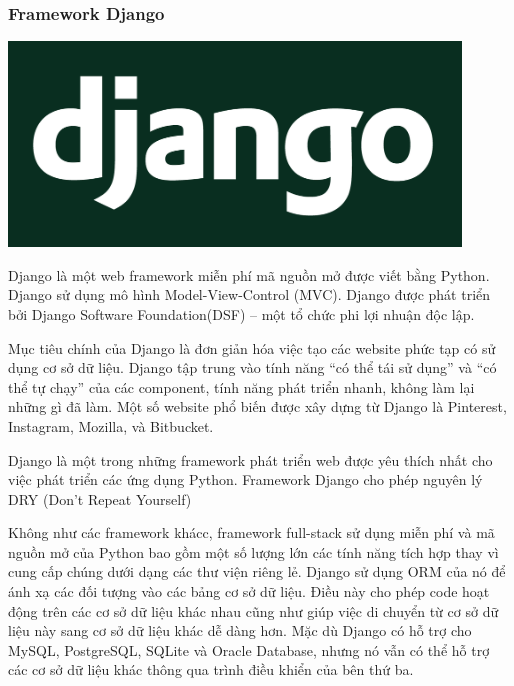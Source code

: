 \subsubsection{Framework Django}
\begin{center}
  \captionsetup{type=figure}
  \includegraphics[width=12cm]{img/django.png}
\end{center}

Django là một web framework miễn phí mã nguồn mở được viết bằng Python. Django sử dụng mô hình Model-View-Control (MVC). Django được phát triển bởi Django Software Foundation(DSF) – một tổ chức phi lợi nhuận độc lập.

Mục tiêu chính của Django là đơn giản hóa việc tạo các website phức tạp có sử dụng cơ sở dữ liệu. Django tập trung vào tính năng “có thể tái sử dụng” và “có thể tự chạy” của các component, tính năng phát triển nhanh, không làm lại những gì đã làm. Một số website phổ biến được xây dựng từ Django là Pinterest, Instagram, Mozilla, và Bitbucket.

Django là một trong những framework phát triển web được yêu thích nhất cho việc phát triển các ứng dụng Python. Framework Django cho phép nguyên lý DRY (Don't Repeat Yourself) 

Không như các framework khácc, framework full-stack sử dụng miễn phí và mã nguồn mở của Python bao gồm một số lượng lớn các tính năng tích hợp thay vì cung cấp chúng dưới dạng các thư viện riêng lẻ. Django sử dụng ORM của nó để ánh xạ các đối tượng vào các bảng cơ sở dữ liệu. Điều này cho phép code hoạt động trên các cơ sở dữ liệu khác nhau cũng như giúp việc di chuyển từ cơ sở dữ liệu này sang cơ sở dữ liệu khác dễ dàng hơn. Mặc dù Django có hỗ trợ cho MySQL, PostgreSQL, SQLite và Oracle Database, nhưng nó vẫn có thể hỗ trợ các cơ sở dữ liệu khác thông qua trình điều khiển của bên thứ ba.

